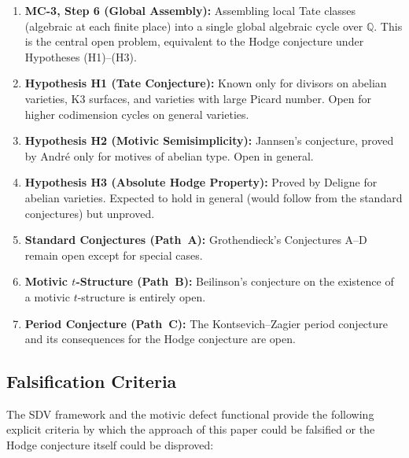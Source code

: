 \documentclass[11pt]{article}
\theoremstyle{definition}
\begin{document}
\begin{enumerate}[label=(\roman*)]
  \item \textbf{MC-3, Step 6 (Global Assembly):} Assembling local Tate
    classes (algebraic at each finite place) into a single global
    algebraic cycle over $\mathbb{Q}$.  This is the central open problem,
    equivalent to the Hodge conjecture under Hypotheses (H1)--(H3).

  \item \textbf{Hypothesis H1 (Tate Conjecture):} Known only for
    divisors on abelian varieties, K3 surfaces, and varieties with
    large Picard number.  Open for higher codimension cycles on
    general varieties.

  \item \textbf{Hypothesis H2 (Motivic Semisimplicity):} Jannsen's
    conjecture, proved by Andr\'e only for motives of abelian type.
    Open in general.

  \item \textbf{Hypothesis H3 (Absolute Hodge Property):} Proved by
    Deligne for abelian varieties.  Expected to hold in general
    (would follow from the standard conjectures) but unproved.

  \item \textbf{Standard Conjectures (Path~A):} Grothendieck's
    Conjectures A--D remain open except for special cases.

  \item \textbf{Motivic $t$-Structure (Path~B):} Beilinson's conjecture
    on the existence of a motivic $t$-structure is entirely open.

  \item \textbf{Period Conjecture (Path~C):} The Kontsevich--Zagier
    period conjecture and its consequences for the Hodge conjecture
    are open.
\end{enumerate}

\subsection{Falsification Criteria}
\label{sec:falsification}

The SDV framework and the motivic defect functional provide the following
explicit criteria by which the approach of this paper could be falsified
or the Hodge conjecture itself could be disproved:
\end{document}
